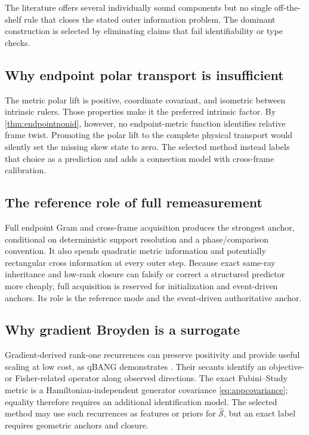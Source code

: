 \documentclass[10pt,twocolumn]{article}
\newcommand{\cref}[1]{\autoref{#1}}
\theoremstyle{definition}
\theoremstyle{remark}
\begin{document}
The literature offers several individually sound components but no single
off-the-shelf rule that closes the stated outer information problem.  The
dominant construction is selected by eliminating claims that fail
identifiability or type checks.

\subsection{Why endpoint polar transport is insufficient}

The metric polar lift is positive, coordinate covariant, and isometric between
intrinsic rulers.  Those properties make it the preferred intrinsic factor.
By \cref{thm:endpointnonid}, however, no endpoint-metric function identifies
relative frame twist.  Promoting the polar lift to the complete physical
transport would silently set the missing skew state to zero.  The selected
method instead labels that choice as a prediction and adds a connection model
with cross-frame calibration.

\subsection{The reference role of full remeasurement}

Full endpoint Gram and cross-frame acquisition produces the strongest anchor,
conditional on deterministic support resolution and a phase/comparison convention.  It
also spends quadratic metric information and potentially rectangular cross
information at every outer step.  Because exact same-ray inheritance and
low-rank closure can falsify or correct a structured predictor more cheaply,
full acquisition is reserved for initialization and event-driven anchors.
Its role is the reference mode and the event-driven authoritative anchor.

\subsection{Why gradient Broyden is a surrogate}

Gradient-derived rank-one recurrences can preserve positivity and provide
useful scaling at low cost, as qBANG demonstrates \cite{Fitzek2024}.  Their
secants identify an objective- or Fisher-related operator along observed
directions.  The exact Fubini--Study metric is a Hamiltonian-independent
generator covariance \eqref{eq:appcovariance}; equality therefore requires an
additional identification model.  The selected method may use such recurrences as
features or priors for $\widehat{\mathcal S}$, but an exact label requires
geometric anchors and closure.
\end{document}
